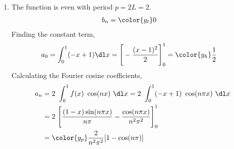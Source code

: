 \begin{enumerate}
    \item The function is even with period $ p = 2L = 2 $.
          \begin{align}
              b_n & = \color{y_t} 0
          \end{align}
          Finding the constant term,
          \begin{align}
              a_0 & = \int_{0}^{1} (-x + 1) \dl x
              = \Bigg[ -\frac{(x-1)^2}{2} \Bigg]_0^1 = \color{y_h} \frac{1}{2}
          \end{align}
          Calculating the Fourier cosine coefficients,
          \begin{align}
              a_n & = 2\ \int_{0}^{1} f(x)\ \cos(nx)\ \dl x
              = 2\ \int_{0}^{1} (-x + 1)\ \cos(n\pi x)\ \dl x          \\
                  & = 2\ \Bigg[ \frac{(1 - x) \sin(n\pi x)}{n\pi}
              - \frac{\cos(n\pi x)}{n^2 \pi^2}  \Bigg]_{0}^{1}         \\
                  & = \color{y_p} \frac{2}{n^2 \pi^2} [1 - \cos(n\pi)]
          \end{align}


\end{enumerate}
